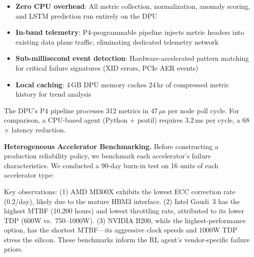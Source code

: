 \documentclass[conference,10pt,letterpaper]{IEEEtran}
\begin{document}
\begin{itemize}
\item \textbf{Zero CPU overhead}: All metric collection, normalization, anomaly scoring, and LSTM prediction run entirely on the DPU
\item \textbf{In-band telemetry}: P4-programmable pipeline injects metric headers into existing data plane traffic, eliminating dedicated telemetry network
\item \textbf{Sub-millisecond event detection}: Hardware-accelerated pattern matching for critical failure signatures (XID errors, PCIe AER events)
\item \textbf{Local caching}: 4\,GB DPU memory caches 24\,hr of compressed metric history for trend analysis
\end{itemize}

The DPU's P4 pipeline processes 312 metrics in 47\,$\mu$s per node poll cycle. For comparison, a CPU-based agent (Python + psutil) requires 3.2\,ms per cycle, a 68$\times$ latency reduction.



\textbf{Heterogeneous Accelerator Benchmarking.} Before constructing a production reliability policy, we benchmark each accelerator's failure characteristics. We conducted a 90-day burn-in test on 16 units of each accelerator type:

\begin{table}[!t]
\caption{Accelerator Reliability Benchmarks (90-Day Burn-In)}
\label{tab:benchmark}
\centering\scriptsize
{}
\end{table}

Key observations: (1) AMD MI300X exhibits the lowest ECC correction rate (0.2/day), likely due to the mature HBM3 interface. (2) Intel Gaudi~3 has the highest MTBF (10,200 hours) and lowest throttling rate, attributed to its lower TDP (600W vs.\ 750--1000W). (3) NVIDIA B200, while the highest-performance option, has the shortest MTBF---its aggressive clock speeds and 1000W TDP stress the silicon. These benchmarks inform the RL agent's vendor-specific failure priors.
\end{document}
